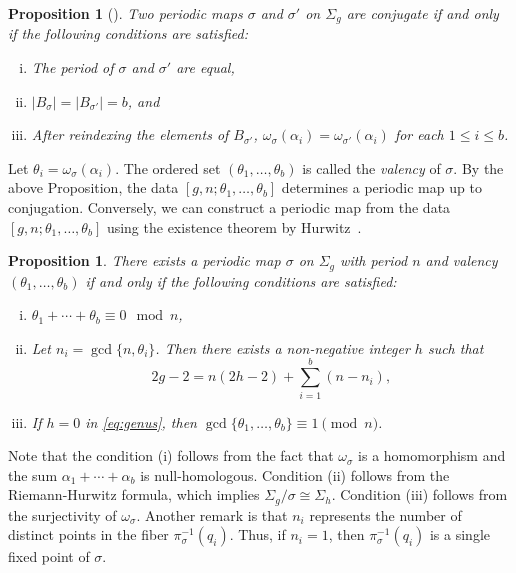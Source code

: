 \documentclass[10pt,a4paper,reqno]{amsart}
\newtheorem{prop}[thm]{Proposition}
\theoremstyle{definition}
\numberwithin{equation}{section}
\numberwithin{figure}{section}
\begin{document}
\begin{prop}[\cite{Ni}]
Two periodic maps $\sigma$ and $\sigma'$ on $\Sigma_g$ are conjugate if and only if the following conditions are satisfied:
\begin{enumerate}[(i)]
\item The period of $\sigma$ and $\sigma'$ are equal,
\item $| B_\sigma |= | B_{\sigma'} |=b$, and
\item After reindexing the elements of $B_{\sigma'}$, 
$\omega_\sigma(\alpha_i)=\omega_{\sigma'}(\alpha_i)$ for each $1\le i \le b$.
\end{enumerate}
\end{prop}

Let $\theta_i=\omega_\sigma(\alpha_i)$. 
The ordered set $(\theta_1,\dots,\theta_b)$ is called the \textit{valency} of $\sigma$.
By the above Proposition, the data $\left[g,n;\theta_1,\dots,\theta_b\right]$ determines a periodic map up to conjugation.
Conversely, we can construct a periodic map from the data $\left[g,n;\theta_1,\dots,\theta_b\right]$ 
using the existence theorem by Hurwitz~\cite{Hu}.

\begin{prop} \label{prop:condition}
There exists a periodic map $\sigma$ on $\Sigma_g$ with period $n$ and valency $(\theta_1,\dots,\theta_b)$ 
if and only if the following conditions are satisfied:
\begin{enumerate}[(i)]
\item $\theta_1+\cdots+\theta_b \equiv 0 \mod n$,
\item Let $n_i=\gcd\{n,\theta_i\}$. Then there exists a non-negative integer $h$ such that
\begin{equation} \label{eq:genus}
2g-2=n(2h-2)+\sum_{i=1}^b (n-n_i),
\end{equation}

\item If $h=0$ in \eqref{eq:genus}, then $\gcd\{\theta_1,\dots,\theta_b\} \equiv 1 \pmod n$.
\end{enumerate}
\end{prop}

Note that the condition (i) follows from the fact that $\omega_\sigma$ is a homomorphism and the sum $\alpha_1+\cdots+\alpha_b$ is null-homologous. 
Condition (ii) follows from the Riemann-Hurwitz formula, which implies $\Sigma_g/\sigma \cong \Sigma_h$.
Condition (iii) follows from the surjectivity of $\omega_\sigma$. 
Another remark is that $n_i$ represents the number of distinct points in the fiber $\pi_\sigma^{-1}(q_i)$. 
Thus, if $n_i=1$, then $\pi_\sigma^{-1}(q_i)$ is a single fixed point of $\sigma$.
\end{document}
